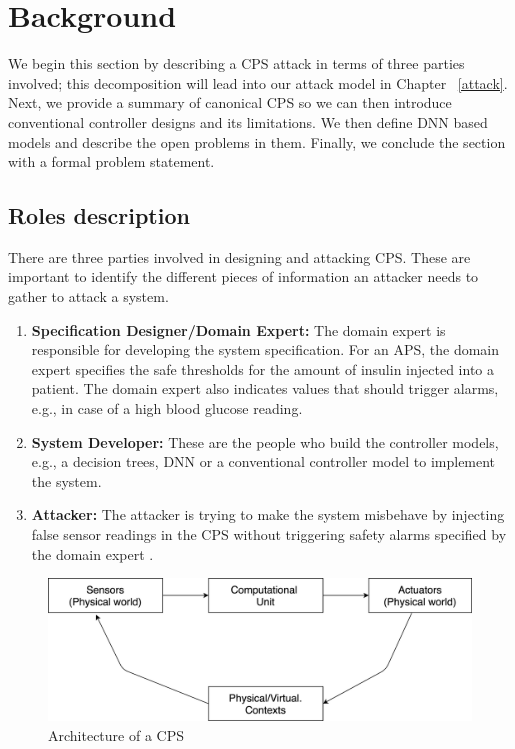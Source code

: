 \chapter{Background}
\label{background}

We begin this section by describing a \ac{CPS} attack in terms of three parties involved; this decomposition will lead into our attack model in Chapter ~\ref{attack}.
Next, we provide a summary of canonical \ac{CPS} so we can then introduce conventional controller designs and its limitations. 
We then define \ac{DNN} based models and describe the open problems in them. 
Finally, we conclude the section with a formal problem statement. 


\section{Roles description}
There are three parties involved in designing and attacking \ac{CPS}. These are important to identify the different pieces of information an attacker needs to gather to attack a system.

\begin{enumerate}
	\item \textbf{Specification Designer/Domain Expert:} The domain expert is responsible for developing the system specification. 
	For an \ac{APS}, the domain expert specifies the safe thresholds for the amount of insulin injected into a patient. The domain expert also indicates values that should trigger alarms, e.g., in case of a high blood glucose reading.
	\item \textbf{System Developer:} These are the people who build the controller models, e.g., a decision trees, \ac{DNN} or a conventional controller model to implement the system.
	\item \textbf{Attacker:} The attacker is trying to make the system misbehave by injecting false sensor readings in the \ac{CPS} without triggering safety alarms specified by the domain expert . 
\end{enumerate}

\begin{figure}
	\centering
	\includegraphics[width=0.7\linewidth]{Images/Systemsdescription}
	\caption{Architecture of a CPS}
	\label{fig:systemsdescription}
\end{figure}

